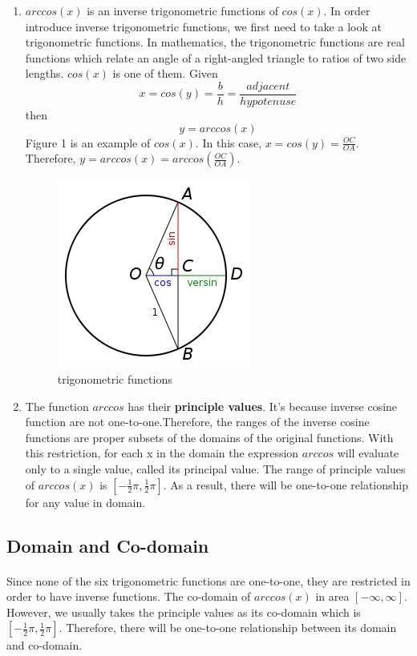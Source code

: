 \documentclass[10pt]{article}
\begin{document}
\begin{enumerate}
    
    \item $arccos(x)$ is an inverse trigonometric functions of $cos(x)$. In order introduce inverse trigonometric functions, we first need to take a look at trigonometric functions. In mathematics, the trigonometric functions are real functions which relate an angle of a right-angled triangle to ratios of two side lengths\cite{einstein}. $cos(x)$ is one of them. Given $$x = cos(y) = \frac{b}{h} = \frac{adjacent}{hypotenuse}$$ then $$y = arccos(x)$$ Figure 1 is an example of $cos(x)$. In this case, $x = cos(y) = \frac{OC}{OA}$. Therefore, $y = arccos(x) = arccos(\frac{OC}{OA})$.
    \begin{center}
      \begin{figure}[h!]
          \centering
          \includegraphics[width=0.3\linewidth]{image/cos_detail.jpg}
          \caption{trigonometric functions}
          \label{fig:my_label}
      \end{figure}
    \end{center}
    
    \item The function $arccos$ has their \textbf{principle values}. It's because inverse cosine function are not one-to-one.Therefore, the ranges of the inverse cosine functions are proper subsets of the domains of the original functions. With this restriction, for each x in the domain the expression $arccos$ will evaluate only to a single value, called its principal value. The range of principle values of $arccos(x)$ is $[-\frac{1}{2}\pi, \frac{1}{2}\pi]$. As a result, there will be one-to-one relationship for any value in domain.
\end{enumerate}

\subsection{Domain and Co-domain}
\paragraph{}
Since none of the six trigonometric functions are one-to-one, they are restricted in order to have inverse functions. The co-domain of $arccos(x)$ in area $[-\infty, \infty]$. However, we usually takes the principle values as its co-domain which is $[-\frac{1}{2}\pi, \frac{1}{2}\pi]$. Therefore, there will be one-to-one relationship between its domain and co-domain.
\end{document}
